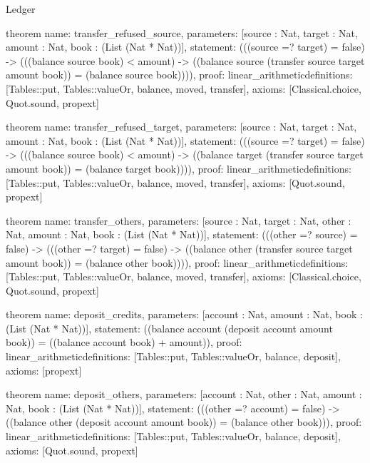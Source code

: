 \begin{lexlean}{Ledger}
\begin{semanticmodule}
theorem{
  name: transfer_refused_source,
  parameters: [source : Nat, target : Nat, amount : Nat, book : (List (Nat * Nat))],
  statement: (((source =? target) = false) -> (((balance source book) < amount) -> ((balance source (transfer source target amount book)) = (balance source book)))),
  proof: linear_arithmetic{definitions: [Tables::put, Tables::valueOr, balance, moved, transfer]},
  axioms: [Classical.choice, Quot.sound, propext]
}

theorem{
  name: transfer_refused_target,
  parameters: [source : Nat, target : Nat, amount : Nat, book : (List (Nat * Nat))],
  statement: (((source =? target) = false) -> (((balance source book) < amount) -> ((balance target (transfer source target amount book)) = (balance target book)))),
  proof: linear_arithmetic{definitions: [Tables::put, Tables::valueOr, balance, moved, transfer]},
  axioms: [Quot.sound, propext]
}

theorem{
  name: transfer_others,
  parameters: [source : Nat, target : Nat, other : Nat, amount : Nat, book : (List (Nat * Nat))],
  statement: (((other =? source) = false) -> (((other =? target) = false) -> ((balance other (transfer source target amount book)) = (balance other book)))),
  proof: linear_arithmetic{definitions: [Tables::put, Tables::valueOr, balance, moved, transfer]},
  axioms: [Classical.choice, Quot.sound, propext]
}

theorem{
  name: deposit_credits,
  parameters: [account : Nat, amount : Nat, book : (List (Nat * Nat))],
  statement: ((balance account (deposit account amount book)) = ((balance account book) + amount)),
  proof: linear_arithmetic{definitions: [Tables::put, Tables::valueOr, balance, deposit]},
  axioms: [propext]
}

theorem{
  name: deposit_others,
  parameters: [account : Nat, other : Nat, amount : Nat, book : (List (Nat * Nat))],
  statement: (((other =? account) = false) -> ((balance other (deposit account amount book)) = (balance other book))),
  proof: linear_arithmetic{definitions: [Tables::put, Tables::valueOr, balance, deposit]},
  axioms: [Quot.sound, propext]
}
\end{semanticmodule}
\end{lexlean}
